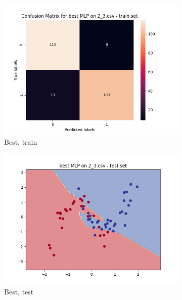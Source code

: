 \documentclass[12pt]{article}
\newcommand*{\subfigwidth}{0.24\textwidth}
\begin{document}
\begin{figure}[H]
\begin{subfigure}[t]{\subfigwidth}
        \includegraphics[width=\linewidth]{img/exp_2/mlp/2_3/best/train_matrix.png}
        \caption{Best, train}
    \end{subfigure}
    \hfill
    \begin{subfigure}[t]{\subfigwidth}
        \includegraphics[width=\linewidth]{img/exp_2/mlp/2_3/best/test_boundary.png}
        \caption{Best, test}
    \end{subfigure}
    \hfill
    \begin{subfigure}[t]{\subfigwidth}

\end{subfigure}
\end{figure}
\end{document}
